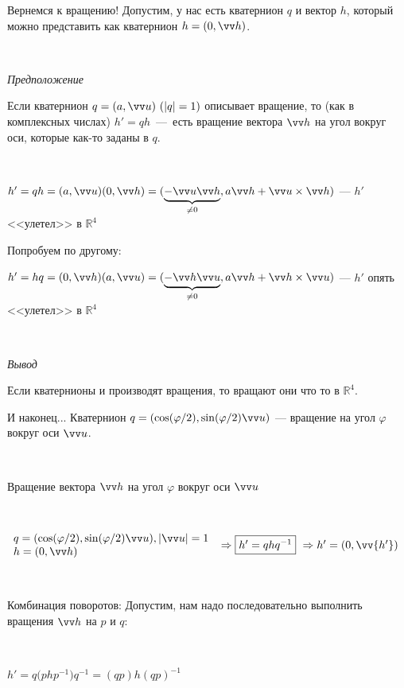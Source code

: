 \documentclass[10pt]{beamer}
\begin{document}
	\begin{frame}{Вернемся к вращению!}
		Допустим, у нас есть кватернион $q$ и вектор $h$, который можно представить как кватернион $h=(0,\vv h)$.
		
		~
		
		\textit{Предположение}
		
		Если кватернион $q =(a,\vv u)\ (|q|=1)$ описывает вращение, то (как в комплексных числах) $h'=qh$~---~есть вращение вектора $\vv h$ на угол вокруг оси, которые как-то заданы в $q$.
		
		~\pause
		
		$h'=qh = (a,\VV u)(0,\VV h) = (\underbrace{-\VV u \VV h}_{\neq 0}, a\vv h + \VV u \times \VV h)$ --- $h'$ <<улетел>>  в $\mathbb R^4$\pause
		
		Попробуем по другому:
		
		$h'=hq = (0,\VV h)(a,\VV u) = (\underbrace{-\VV h \VV u}_{\neq 0}, a\vv h + \VV h \times \VV u)$ --- $h'$ опять <<улетел>>  в $\mathbb R^4$
		
		~\pause
		
		\textit{Вывод}
		
		Если кватернионы и производят вращения, то вращают они что то в $\mathbb R^4$.
		
	\end{frame}
	
	
	\begin{frame}{И наконец...}
		Кватернион $q=(\cos(\varphi/2), \sin(\varphi/2) \vv u)$ --- вращение на угол $\varphi$ вокруг оси $\vv u$.
		
		~
		
		\begin{block}{Вращение вектора $\vv h$ на угол $\varphi$ вокруг оси $\vv u$ }
		\centering
		
		~
		
		$
		\begin{array}{l}
			q=(\cos(\varphi/2), \sin(\varphi/2) \vv u), |\vv u|=1\\
			h=(0,\vv h)
		\end{array}
		\ \Rightarrow
		\fbox{$h'=qhq^{-1}$}
		\ \Rightarrow
		h'=(0,\vv {h'})
		$
		\end{block}
		
				
		~
		
		Комбинация поворотов:
		Допустим, нам надо последовательно выполнить вращения  $\vv h$ на $p$ и $q$:
		
		~
		
		$h'=q\big(php^{-1}\big)q^{-1}=(qp)h(qp)^{-1}$
		
	\end{frame}
	
\end{document}
